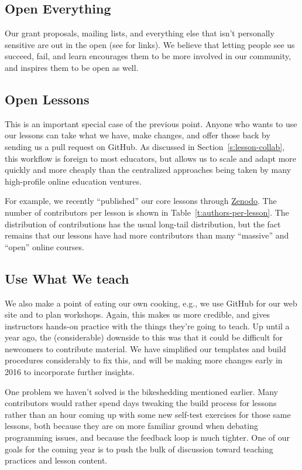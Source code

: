 \documentclass[10pt,a4paper,twocolumn]{article}
\begin{document}
\subsection{Open Everything}

Our grant proposals, mailing lists, and everything else that isn't
personally sensitive are out in the open (see \cite{swcsite} for
links).  We believe that letting people see us succeed, fail, and
learn encourages them to be more involved in our community, and
inspires them to be open as well.

\subsection{Open Lessons}

This is an important special case of the previous point. Anyone who
wants to use our lessons can take what we have, make changes, and
offer those back by sending us a pull request on GitHub. As discussed
in Section~\ref{s:lesson-collab}, this workflow is foreign to most
educators, but allows us to scale and adapt more quickly and more
cheaply than the centralized approaches being taken by many
high-profile online education ventures.

For example, we recently ``published'' our core lessons through
\href{https://zenodo.org/}{Zenodo}.  The number of contributors per
lesson is shown in Table~\ref{t:authors-per-lesson}.  The distribution
of contributions has the usual long-tail distribution, but the fact
remains that our lessons have had more contributors than many
``massive'' and ``open'' online courses.

\subsection{Use What We teach}

We also make a point of eating our own cooking, e.g., we use GitHub
for our web site and to plan workshops. Again, this makes us more
credible, and gives instructors hands-on practice with the things
they're going to teach.  Up until a year ago, the (considerable)
downside to this was that it could be difficult for newcomers to
contribute material.  We have simplified our templates and build
procedures considerably to fix this, and will be making more changes
early in 2016 to incorporate further insights.

One problem we haven't solved is the bikeshedding mentioned earlier.
Many contributors would rather spend days tweaking the build process
for lessons rather than an hour coming up with some new self-test
exercises for those same lessons, both because they are on more
familiar ground when debating programming issues, and because the
feedback loop is much tighter.  One of our goals for the coming year
is to push the bulk of discussion toward teaching practices and lesson
content.
\end{document}
